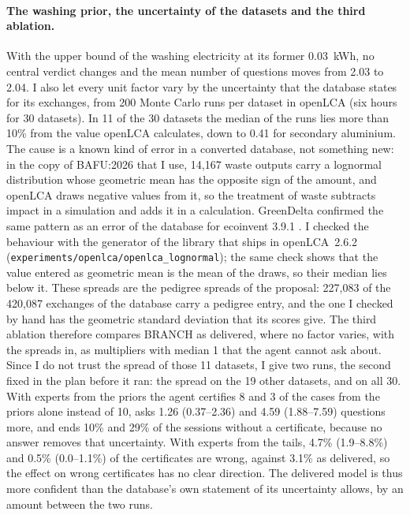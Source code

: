 \documentclass{article}
\begin{document}
\paragraph{The washing prior, the uncertainty of the datasets and the third ablation.}
With the upper bound of the washing electricity at its former 0.03~kWh, no central verdict changes and the
mean number of questions moves from 2.03 to 2.04. I also let every unit factor vary by the uncertainty that
the database states for its exchanges, from 200 Monte Carlo runs per dataset in openLCA (six hours for
30 datasets). In 11 of the 30 datasets the median of the runs
lies more than 10\% from the value openLCA calculates, down to 0.41 for secondary aluminium. The cause is
a known kind of error in a converted database, not something new: in the copy of BAFU:2026 that I use,
14,167 waste outputs carry a lognormal distribution whose geometric mean has the opposite sign of the
amount, and openLCA draws negative values from it, so the treatment of waste subtracts impact in a
simulation and adds it in a calculation. GreenDelta confirmed the same pattern as an error of the
database for ecoinvent 3.9.1 \citep{askopenlca2023}. I checked the behaviour with the generator of the
library that ships in openLCA~2.6.2 (\texttt{experiments/openlca/openlca\_lognormal}); the same check shows that
the value entered as geometric mean is the mean of the draws, so their median lies below it. These
spreads are the pedigree spreads of the proposal: 227,083 of the 420,087 exchanges of the database carry a
pedigree entry, and the one I checked by hand has the geometric standard deviation that its scores give.
The third ablation therefore compares BRANCH as delivered, where no factor varies, with the spreads in, as
multipliers with median 1 that the agent cannot ask about. Since I do not trust the spread of those 11
datasets, I give two runs, the second fixed in the plan before it ran: the spread on the 19 other datasets,
and on all 30. With experts from the priors the agent certifies 8 and 3 of the \nCases{} cases from the
priors alone instead of 10, asks 1.26 (0.37--2.36) and 4.59 (1.88--7.59) questions more, and ends 10\% and
29\% of the sessions without a certificate, because no answer removes that uncertainty. With experts from
the tails, 4.7\% (1.9--8.8\%) and 0.5\% (0.0--1.1\%) of the certificates are wrong, against 3.1\% as
delivered, so the effect on wrong certificates has no clear direction. The delivered model is thus more
confident than the database's own statement of its uncertainty allows, by an amount between the two runs.
\end{document}
